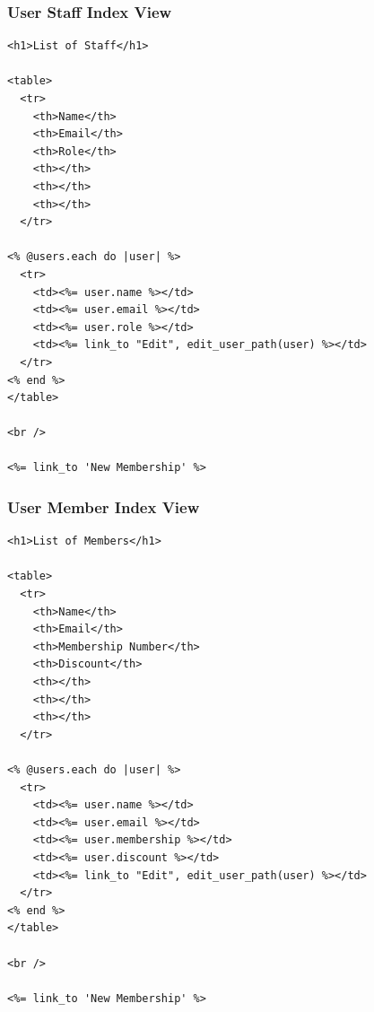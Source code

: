 \documentclass[a4paper]{article}
\begin{document}
\subsubsection{User Staff Index View}
\begin{verbatim}
<h1>List of Staff</h1>

<table>
  <tr>
    <th>Name</th>
    <th>Email</th>
    <th>Role</th>
    <th></th>
    <th></th>
    <th></th>
  </tr>

<% @users.each do |user| %>
  <tr>
    <td><%= user.name %></td>
    <td><%= user.email %></td>
    <td><%= user.role %></td>
    <td><%= link_to "Edit", edit_user_path(user) %></td>
  </tr>
<% end %>
</table>

<br />

<%= link_to 'New Membership' %>

\end{verbatim}
\subsubsection{User Member Index View}
\begin{verbatim}
<h1>List of Members</h1>

<table>
  <tr>
    <th>Name</th>
    <th>Email</th>
    <th>Membership Number</th>
    <th>Discount</th>
    <th></th>
    <th></th>
    <th></th>
  </tr>

<% @users.each do |user| %>
  <tr>
    <td><%= user.name %></td>
    <td><%= user.email %></td>
    <td><%= user.membership %></td>
    <td><%= user.discount %></td>
    <td><%= link_to "Edit", edit_user_path(user) %></td>
  </tr>
<% end %>
</table>

<br />

<%= link_to 'New Membership' %>

\end{verbatim}
\end{document}

